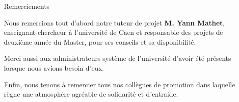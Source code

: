 {\Huge{Remerciements}}

\vspace{2cm}
Nous remercions tout d'abord notre tuteur de projet \textbf{M. Yann Mathet}, enseignant-chercheur à l'université de Caen et responsable des projets de deuxième année du Master, pour ses conseils et sa disponibilité.

Merci aussi aux administrateurs système de l'université d'avoir été présents lorsque nous avions besoin d'eux.

Enfin, nous tenons à remercier tous nos collègues de promotion dans laquelle règne une atmosphère agréable de solidarité et d'entraide.

